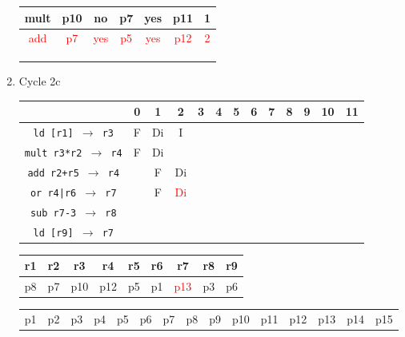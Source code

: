 \documentclass[12pt]{article}
\begin{document}
\begin{enumerate}
\begin{table}[H]
\begin{tabular}{|c|c|c|c|c|c|c|}
					mult & p10 & no & p7 & yes & p11 & 1\\
					\hline
					\textcolor{red}{add} & \textcolor{red}{p7} & \textcolor{red}{yes} & \textcolor{red}{p5} & \textcolor{red}{yes} & \textcolor{red}{p12} & \textcolor{red}{2}\\
					\hline
					 &  &  &  &  &  & \\
					\hline
					 &  &  &  &  &  & \\
					\hline
					 &  &  &  &  &  & \\
					\hline
				\end{tabular}
			\end{table}
		\item
			Cycle 2c
			\begin{table}[H]
				\begin{tabular}{|c|c|c|c|c|c|c|c|c|c|c|c|c|}
					\hline
					 & 0 & 1 & 2 & 3 & 4 & 5 & 6 & 7 & 8 & 9 & 10 & 11\\
					\hline
					\texttt{ld [r1] $\rightarrow$ r3} & F & Di & I &  &  &  &  &  &  &  &  &\\
					\hline
					\texttt{mult r3*r2 $\rightarrow$ r4} & F & Di &  &  &  &  &  &  &  &  &  &\\
					\hline
					\texttt{add r2+r5 $\rightarrow$ r4} &  & F & Di &  &  &  &  &  &  &  &  &\\
					\hline
					\texttt{or r4|r6 $\rightarrow$ r7} &  & F & \textcolor{red}{Di} &  &  &  &  &  &  &  &  &\\
					\hline
					\texttt{sub r7-3 $\rightarrow$ r8} &  &  &  &  &  &  &  &  &  &  &  &\\
					\hline
					\texttt{ld [r9] $\rightarrow$ r7} &  &  &  &  &  &  &  &  &  &  &  &\\
					\hline 
				\end{tabular}
			\end{table}
			\begin{table}[H]
				\begin{tabular}{|c|c|c|c|c|c|c|c|c|}
					\hline
					r1 & r2 & r3 & r4 & r5 & r6 & r7 & r8 & r9\\
					\hline
					p8 & p7 & p10 & p12 & p5 & p1 & \textcolor{red}{p13} & p3 & p6\\
					\hline
				\end{tabular}
			\end{table}
			\begin{table}[H]
				\begin{tabular}{|c|c|c|c|c|c|c|c|c|c|c|c|c|c|c|}
					\hline
					p1 & p2 & p3 & p4 & p5 & p6 & p7 & p8 & p9 & p10 & p11 & p12 & p13 & p14 & p15\\

\end{tabular}
\end{table}
\end{enumerate}
\end{document}
